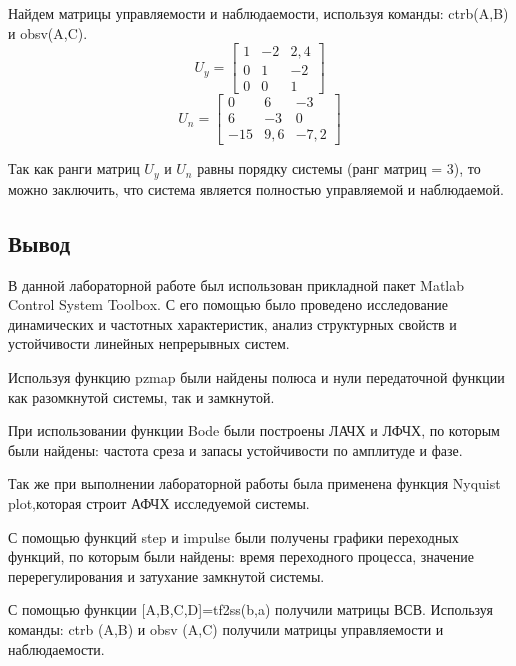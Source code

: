 \documentclass[12pt, a4paper]{article}
\begin{document}
\par Найдем матрицы управляемости и наблюдаемости, используя команды: ctrb(A,B) и obsv(A,C).
\begin{equation*}
U_y =\begin{bmatrix}
    1   &   -2   &   2,4 \\
    0   &   1   &	-2 \\
    0   &   0  &   1
\end{bmatrix}
\end{equation*}
\begin{equation*}
U_n =\begin{bmatrix}
    0    &   6       &   -3 \\
    6       &   -3      &	0 \\
    -15   &   9,6   &   -7,2
\end{bmatrix}
\end{equation*}\par
Так как ранги матриц $U_{y}$ и $U_n$ равны порядку системы (ранг матриц = 3), то можно заключить, что система является полностью
управляемой и наблюдаемой.
\newpage
\begin{center}
\section*{Вывод} 
\end{center}
 \par  В данной лабораторной работе был использован прикладной пакет Matlab Control System Toolbox. С его помощью было проведено исследование 
 динамических и частотных характеристик, анализ структурных свойств и устойчивости линейных непрерывных систем.
 \par Используя функцию pzmap были найдены полюса и нули передаточной функции как разомкнутой системы, так и  замкнутой.
 \par При использовании функции Bode были построены ЛАЧХ и ЛФЧХ, по которым были найдены: частота среза и запасы устойчивости по амплитуде и фазе.
 \par Так же при выполнении лабораторной работы была применена функция Nyquist plot,которая строит АФЧХ исследуемой системы. 
 \par С помощью функций step и impulse были получены графики переходных функций, по которым были найдены: время переходного процесса,
 значение перерегулирования и затухание замкнутой системы.
 \par С помощью функции [A,B,C,D]=tf2ss(b,a) получили матрицы ВСВ. Используя команды: ctrb (A,B) и obsv (A,C) 
 получили матрицы управляемости и наблюдаемости.
 
\end{document}
